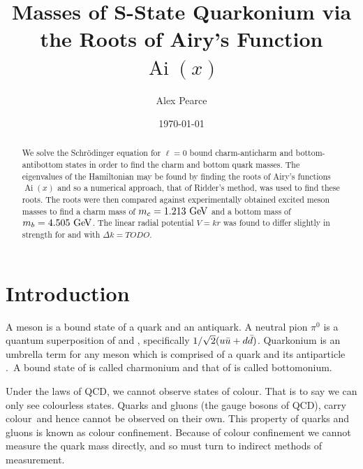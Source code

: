 \documentclass[]{article}
\newcommand{\Ai}[1]{\ensuremath{\operatorname{Ai}({#1})}}
\begin{document}
\title{Masses of S-State Quarkonium via the Roots of Airy's Function $\Ai{x}$}
\author{Alex Pearce}
\date{\today}
\maketitle


\begin{abstract}
We solve the Schr\"{o}dinger equation for $\ell = 0$ bound charm-anticharm \ccbar and bottom-antibottom \bbbar states in order to find the charm and bottom quark masses. The eigenvalues of the Hamiltonian may be found by finding the roots of Airy's functions $\Ai{x}$ and so a numerical approach, that of Ridder's method, was used to find these roots. The roots were then compared against experimentally obtained excited meson masses to find a charm mass of $m_{c} = 1.213\GeV$ and a bottom mass of $m_{b} = 4.505\GeV$. The linear radial potential $V = kr$ was found to differ slightly in strength for \ccbar and \bbbar with $\Delta k = TODO$.
\end{abstract}


\section{Introduction}\label{sec:intro}

A meson is a bound state of a quark and an antiquark. A neutral pion $\pi^{0}$ is a quantum superposition of \uubar and \ddbar, specifically $1/\sqrt{2}(u\bar{u}  + d\bar{d} )$. Quarkonium is an umbrella term for any meson which is comprised of a quark and its antiparticle \qqbar.\footnotemark\ A bound state of \ccbar is called charmonium and that of \bbbar is called bottomonium.


Under the laws of QCD, we cannot observe states of colour. That is to say we can only see colourless states. Quarks and gluons (the gauge bosons of QCD), carry colour\footnotemark\ and hence cannot be observed on their own. This property of quarks and gluons is known as colour confinement. Because of colour confinement we cannot measure the quark mass directly, and so must turn to indirect methods of measurement.

\end{document}
